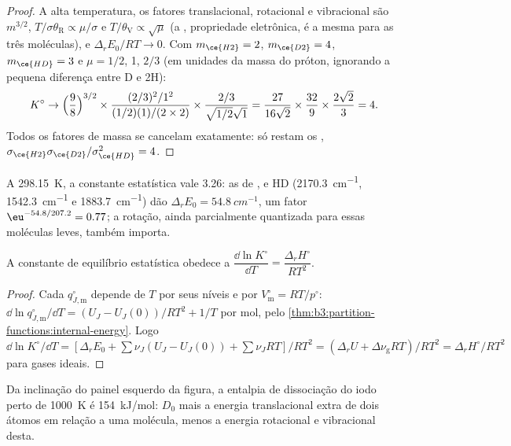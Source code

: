 \begin{proof}
A alta temperatura, os fatores translacional, rotacional e vibracional são
$m^{3/2}$, $T/\sigma\theta_{\mathrm R} \propto \mu/\sigma$ e $T/\theta_{\mathrm V} \propto \sqrt\mu$ (a ,
propriedade eletrônica, é a mesma para as três moléculas), e $\Delta_rE_0/RT \to 0$.
Com $m_{\ce{H2}} = 2$, $m_{\ce{D2}} = 4$, $m_{\ce{HD}} = 3$ e $\mu = 1/2$, 1, $2/3$ (em unidades da
massa do próton, ignorando a pequena diferença entre D e 2H):
\[
  K^\circ \to \Bigl(\frac{9}{8}\Bigr)^{3/2} \times \frac{(2/3)^2/1^2}{(1/2)(1)/(2 \times 2)}
  \times \frac{2/3}{\sqrt{1/2}\sqrt1}
  = \frac{27}{16\sqrt2} \times \frac{32}{9} \times \frac{2\sqrt2}{3} = 4 .
\]
Todos os fatores de massa se cancelam exatamente: só restam os , $\sigma_{\ce{H2}}
\sigma_{\ce{D2}}/\sigma_{\ce{HD}}^2 = 4$.
\end{proof}

A \qty{298.15}{K}, a constante estatística vale 3.26: as  de ,
 e HD (\qty{2170.3}{cm^{-1}}, \qty{1542.3}{cm^{-1}} e \qty{1883.7}{cm^{-1}}) dão $\Delta_rE_0 =
\qty{54.8}{cm^{-1}}$, um fator $\eu^{-54.8/207.2} = 0.77$; a rotação, ainda parcialmente
quantizada para essas moléculas leves, também importa.

\begin{proposition}\label{prop:b3:statistical-thermo-applied:vant-hoff-stat}
A constante de equilíbrio estatística obedece a $\dfrac{\dd\ln K^\circ}{\dd T} = \dfrac{\Delta_rH^\circ}{RT^2}$.
\end{proposition}

\begin{proof}
Cada $q^\circ_{J,\mathrm m}$ depende de $T$ por seus níveis e por $V^\circ_{\mathrm m} = RT/p^\circ$:
$\dd\ln q^\circ_{J,\mathrm m}/\dd T = (U_J - U_J(0))/RT^2 + 1/T$ por mol, pelo
\cref{thm:b3:partition-functions:internal-energy}. Logo $\dd\ln K^\circ/\dd T =
[\Delta_rE_0 + \sum\nu_J(U_J - U_J(0)) + \sum\nu_JRT]/RT^2 = (\Delta_rU + \Delta\nu_{\mathrm g}RT)/RT^2 =
\Delta_rH^\circ/RT^2$ para gases ideais.
\end{proof}

Da inclinação do painel esquerdo da figura, a entalpia de dissociação do iodo
perto de \qty{1000}{K} é \qty{154}{kJ/mol}: $D_0$ mais a energia translacional
extra de dois átomos em relação a uma molécula, menos a energia rotacional e
vibracional desta.

